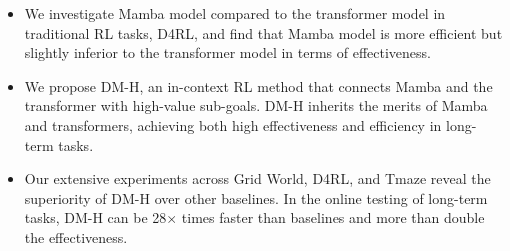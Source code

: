 \begin{itemize}[noitemsep,leftmargin=*]
   
    \item We investigate Mamba model compared to the transformer model in traditional RL tasks, D4RL, and find that Mamba model is more efficient but slightly inferior to the transformer model in terms of effectiveness.
    \item We propose DM-H, an in-context RL method that connects Mamba and the transformer with high-value sub-goals. DM-H inherits the merits of Mamba and transformers, achieving both high effectiveness and efficiency in long-term tasks.
    \item Our extensive experiments across Grid World, D4RL, and Tmaze reveal the superiority of DM-H over other baselines. In the online testing of long-term tasks, DM-H can be 28$\times$ times faster than baselines and more than double the effectiveness.
\end{itemize}





